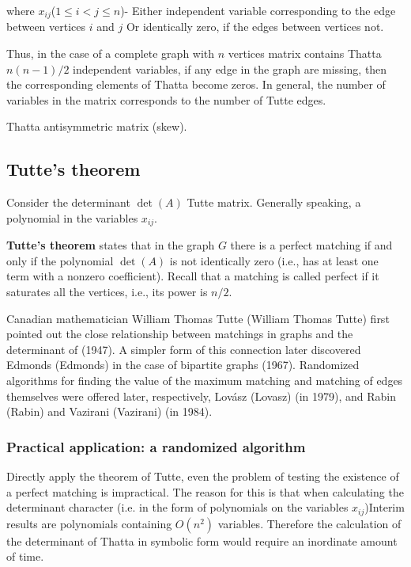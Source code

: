where $x_ {ij}$($1 \le i <j \le n$)- Either independent variable corresponding to the edge between vertices $i$ and $j$ Or identically zero, if the edges between vertices not.

Thus, in the case of a complete graph with $n$ vertices matrix contains Thatta $n (n-1) / 2$ independent variables, if any edge in the graph are missing, then the corresponding elements of Thatta become zeros. In general, the number of variables in the matrix corresponds to the number of Tutte edges.

Thatta antisymmetric matrix (skew).

\subsection{ Tutte's theorem }

Consider the determinant $\det (A)$ Tutte matrix. Generally speaking, a polynomial in the variables $x_ {ij}$.

\textbf{Tutte's theorem} states that in the graph $G$ there is a perfect matching if and only if the polynomial $\det (A)$ is not identically zero (i.e., has at least one term with a nonzero coefficient). Recall that a matching is called perfect if it saturates all the vertices, i.e., its power is $n / 2$.

Canadian mathematician William Thomas Tutte (William Thomas Tutte) first pointed out the close relationship between matchings in graphs and the determinant of (1947). A simpler form of this connection later discovered Edmonds (Edmonds) in the case of bipartite graphs (1967). Randomized algorithms for finding the value of the maximum matching and matching of edges themselves were offered later, respectively, Lovász (Lovasz) (in 1979), and Rabin (Rabin) and Vazirani (Vazirani) (in 1984).

\subsubsection{ Practical application: a randomized algorithm }

Directly apply the theorem of Tutte, even the problem of testing the existence of a perfect matching is impractical. The reason for this is that when calculating the determinant character (i.e. in the form of polynomials on the variables $x_ {ij}$)Interim results are polynomials containing $O (n ^ 2)$ variables. Therefore the calculation of the determinant of Thatta in symbolic form would require an inordinate amount of time.


